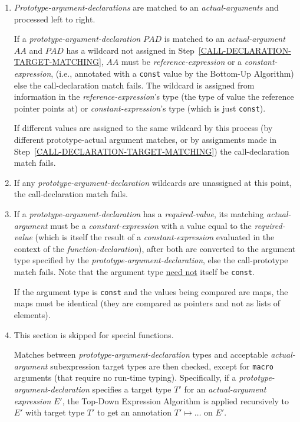 \documentclass[12pt]{article}
\begin{document}
\begin{enumerate}
\item\label{CALL-DECLARATION-ARGUMENT-MATCHING}
{\em Prototype-argument-declarations} are matched to
an {\em actual-arguments} and processed left to right.

If a {\em prototype-argument-declaration} $PAD$ is matched
to an {\em actual-argument} $AA$ and $PAD$ has a wildcard not
assigned in Step~\ref{CALL-DECLARATION-TARGET-MATCHING},
$AA$ must be {\em reference-expression} or a {\em constant-expression},
(i.e., annotated with a {\tt const} value by the Bottom-Up Algorithm)
else the
call-declaration match fails.  The wildcard is assigned from
information in the {\em reference-expression}'s
type (the type of value the reference pointer points at) or
{\em constant-expression}'s type (which is just {\tt const}).

If different values are assigned to the same wildcard by this
process (by different prototype-actual argument matches, or by
assignments made in Step~\ref{CALL-DECLARATION-TARGET-MATCHING})
the call-declaration match fails.

\item\label{CALL-DECLARATION-UNASSIGNED-WILDCARDS}
If any {\em prototype-argument-declaration} wildcards are unassigned
at this point,
the call-declaration match fails.

\item\label{CALL-DECLARATION-REQUIRED-VALUES}
If a {\em prototype-argument-declaration} has a {\em required-value},
its matching {\em actual-argument} must be a {\em constant-expression} with
a value equal to the {\em required-value} (which is itself the result
of a {\em constant-expression} evaluated in the context of the
{\em function-declaration}), after both are converted
to the argument type specified by the {\em prototype-argument-declaration},
else the call-prototype
match fails.  Note that the argument type \underline{need not} itself
be {\tt const}.

If the argument type is {\tt const} and the values being compared are
maps, the maps must be identical (they are compared as pointers and
not as lists of elements).

\item\label{CALL-DECLARATION-ARGUMENT-TYPING}
This section is skipped for special functions.

Matches between {\em prototype-argument-declaration} types
and acceptable {\em actual-argu\-ment} subexpression target types
are then checked, except for {\tt macro} arguments (that require
no run-time typing).  Specifically, if a {\em prototype-argument-declaration}
specifies a target type $T'$ for an {\em actual-argument} {\em expression} $E'$,
the Top-Down Expression Algorithm
is applied recursively to $E'$ with target type $T'$ to get
an annotation $T'\mapsto\ldots$ on $E'$.


\end{enumerate}
\end{document}
